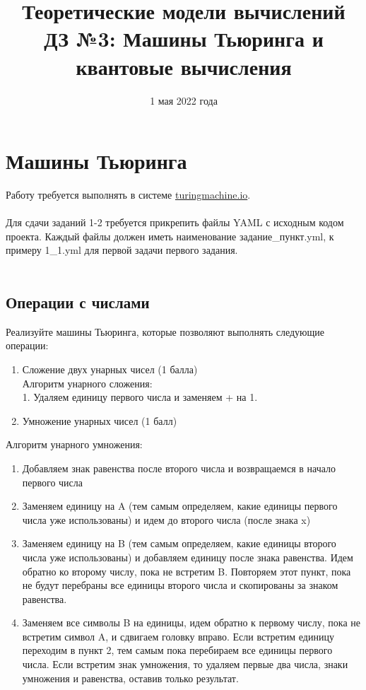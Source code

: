 \documentclass{article}
\title{Теоретические модели вычислений \\
ДЗ №3: Машины Тьюринга и квантовые вычисления}
\date{1 мая 2022 года}
\begin{document}
\maketitle

\section{Машины Тьюринга}

Работу требуется выполнять в системе \url{turingmachine.io}. \\\\
Для сдачи заданий 1-2 требуется прикрепить файлы YAML с исходным кодом проекта. Каждый файлы должен иметь наименование задание\_пункт.yml, к примеру 1\_1.yml для первой задачи первого задания. \\\\

\subsection{Операции с числами}

Реализуйте машины Тьюринга, которые позволяют выполнять следующие операции:
\begin{enumerate}
    \item Сложение двух унарных чисел (1 балла)
    \\Алгоритм унарного сложения: \\1. Удаляем единицу первого числа и заменяем + на 1.
    \item Умножение унарных чисел (1 балл)
\end{enumerate}
Алгоритм унарного умножения:
\begin{enumerate}
    \item Добавляем знак равенства после второго числа и возвращаемся в начало первого числа

    \item Заменяем единицу на A (тем самым определяем, какие единицы первого числа уже использованы) и идем до второго числа (после знака x)
    
    \item Заменяем единицу на B (тем самым определяем, какие единицы второго числа уже использованы) и добавляем единицу после знака равенства. Идем обратно ко второму числу, пока не встретим B. Повторяем этот пункт, пока не будут перебраны все единицы второго числа и скопированы за знаком равенства. 
    
    \item Заменяем все символы B на единицы, идем обратно к первому числу, пока не встретим символ A, и сдвигаем головку вправо. Если встретим единицу переходим в пункт 2, тем самым пока перебираем все единицы первого числа. Если встретим знак умножения, то удаляем первые два числа, знаки умножения и равенства, оставив только результат. 
\end{enumerate}
\end{document}
